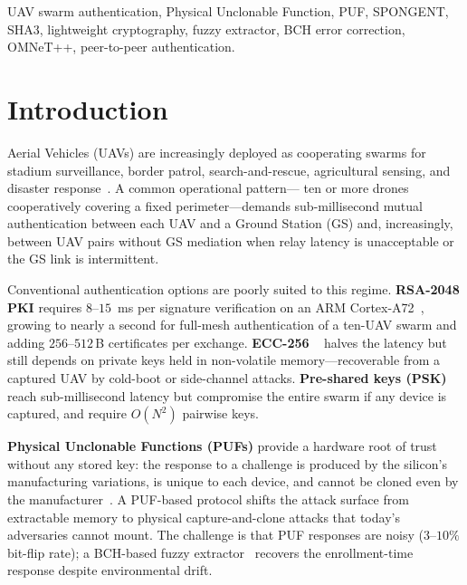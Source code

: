 \documentclass[conference,a4paper,10pt]{IEEEtran}
\begin{document}
\begin{IEEEkeywords}
UAV swarm authentication, Physical Unclonable Function, PUF,
SPONGENT, SHA3, lightweight cryptography, fuzzy extractor, BCH error
correction, OMNeT++, peer-to-peer authentication.
\end{IEEEkeywords}


\section{Introduction}
\label{sec:intro}

 Aerial Vehicles (UAVs) are increasingly
deployed as cooperating swarms for stadium surveillance, border
patrol, search-and-rescue, agricultural sensing, and disaster
response~\cite{securing_uav_fanet}. A common operational pattern---
ten or more drones cooperatively covering a fixed perimeter---demands
sub-millisecond mutual authentication between each UAV and a Ground
Station (GS) and, increasingly, between UAV pairs without GS
mediation when relay latency is unacceptable or the GS link is
intermittent.

Conventional authentication options are poorly suited to this regime.
\textbf{RSA-2048 PKI} requires $8$--$15$~ms per signature verification
on an ARM Cortex-A72~\cite{puf_lightweight_uav}, growing to nearly
a second for full-mesh authentication of a ten-UAV swarm and adding
$256$--$512$\,B certificates per exchange. \textbf{ECC-256}
~\cite{peer2peer_auth} halves the latency but still depends on
private keys held in non-volatile memory---recoverable from a
captured UAV by cold-boot or side-channel attacks. \textbf{Pre-shared
keys (PSK)} reach sub-millisecond latency but compromise the entire
swarm if any device is captured, and require $O(N^2)$ pairwise keys.

\textbf{Physical Unclonable Functions (PUFs)} provide a hardware root
of trust without any stored key: the response to a challenge is
produced by the silicon's manufacturing variations, is unique to each
device, and cannot be cloned even by the
manufacturer~\cite{puf_overview}. A PUF-based protocol shifts the
attack surface from extractable memory to physical capture-and-clone
attacks that today's adversaries cannot mount. The challenge is that
PUF responses are noisy ($3$--$10\%$ bit-flip rate); a BCH-based
fuzzy extractor~\cite{bch_puf_extraction, helper_data_masking}
recovers the enrollment-time response despite environmental drift.
\end{document}
